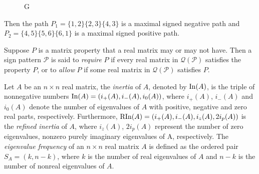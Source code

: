 \documentclass[a4paper, 10pt]{article}
\numberwithin{equation}{section}
\def\In{{\rm In}}
\def\RIn{{\rm RIn}}
\begin{document}
	\begin{figure}[H] \label{nfig11}
		\tikzset{node distance=1cm}
		\centering
		 \caption{G}\end{figure}
	Then the path $P_1=\{1,2\}\{2,3\}\{4,3\}$ is a maximal signed negative path and $P_2=\{4,5\}\{5,6\}\{6,1\}$ is a maximal signed positive path.
	
	Suppose $P$ is a matrix property that a real matrix may or may not have. Then a sign pattern $\mathcal{P}$ is said to \textit{require} $P$ if every real matrix in $\mathcal{Q}(\mathcal{P})$ satisfies the property $P$, or to \textit{allow} $P$ if some real matrix in $\mathcal{Q}(\mathcal{P})$ satisfies $P$.
	
	
	
	Let $A$ be an $n\times n$ real matrix, the \textit{inertia} of $A$,  denoted by $\In(A)$, is the triple of nonnegative numbers $\In(A)=(i_+(A), i_-(A),i_0(A))$, where $i_+(A)$, $i_-(A)$ and $i_0(A)$ denote the number of eigenvalues of $A$ with positive, negative and zero real parts, respectively. Furthermore, $\RIn(A) = (i_+(A), i_-(A), i_z(A), 2i_{p}(A))$ is the \textit{refined inertia} of $A$, where $i_z(A)$, $2i_{p}(A)$ represent the number of zero eigenvalues, nonzero purely imaginary eigenvalues of A, respectively. The \textit{eigenvalue frequency} of an $n\times n$ real matrix $A$ is defined as the ordered pair $S_A=(k,n-k)$, where $k$ is the number of real eigenvalues of $A$ and $n-k$ is the number of nonreal eigenvalues of $A$. 
	
\end{document}

